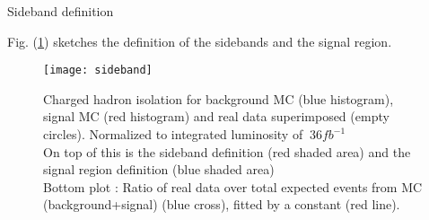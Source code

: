 \begin{description}
	\item [Sideband definition]
\end{description}


Fig. (\ref{sideband}) sketches the definition of the sidebands and the signal region.

\begin{figure}[ht!]
  \centering
  \texttt{[image: sideband]}\\[1cm]
  \caption{Charged hadron isolation for background MC (blue histogram), signal MC (red histogram) and real data
  superimposed (empty circles). Normalized to integrated luminosity of $~36fb^{-1}$\\On top of this is the sideband
  definition (red shaded area) and the signal region definition (blue shaded area)\\Bottom plot : Ratio of real data over total expected events from MC (background+signal) (blue cross), fitted by a constant (red line).}
  \label{sideband}
\end{figure}

